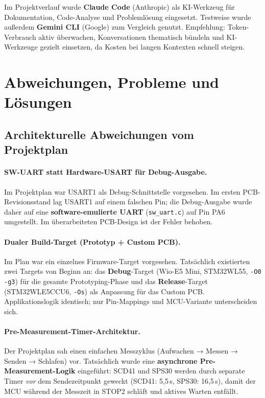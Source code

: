 \documentclass[11pt,a4paper]{scrartcl}
\begin{document}
Im Projektverlauf wurde \textbf{Claude Code} (Anthropic) als KI-Werkzeug für Dokumentation, Code-Analyse und Problemlösung eingesetzt. Testweise wurde außerdem \textbf{Gemini CLI} (Google) zum Vergleich genutzt. Empfehlung: Token-Verbrauch aktiv überwachen, Konversationen thematisch bündeln und KI-Werkzeuge gezielt einsetzen, da Kosten bei langen Kontexten schnell steigen.

\clearpage
\section{Abweichungen, Probleme und Lösungen}

\subsection*{Architekturelle Abweichungen vom Projektplan}

\paragraph{SW-UART statt Hardware-USART für Debug-Ausgabe.}
Im Projektplan war USART1 als Debug-Schnittstelle vorgesehen. Im ersten PCB-Revisionsstand lag USART1 auf einem falschen Pin; die Debug-Ausgabe wurde daher auf eine \textbf{software-emulierte UART} (\texttt{sw\_uart.c}) auf Pin PA6 umgestellt. Im überarbeiteten PCB-Design ist der Fehler behoben.

\paragraph{Dualer Build-Target (Prototyp + Custom PCB).}
Im Plan war ein einzelnes Firmware-Target vorgesehen. Tatsächlich existierten zwei Targets von Beginn an: das \textbf{Debug}-Target (Wio-E5 Mini, STM32WL55, \texttt{-O0 -g3}) für die gesamte Prototyping-Phase und das \textbf{Release}-Target (STM32WLE5CCU6, \texttt{-Os}) als Anpassung für das Custom PCB. Applikationslogik identisch; nur Pin-Mappings und MCU-Variante unterscheiden sich.

\paragraph{Pre-Measurement-Timer-Architektur.}
Der Projektplan sah einen einfachen Messzyklus (Aufwachen → Messen → Senden → Schlafen) vor. Tatsächlich wurde eine \textbf{asynchrone Pre-Measurement-Logik} eingeführt: SCD41 und SPS30 werden durch separate Timer \textit{vor} dem Sendezeitpunkt geweckt (SCD41: 5,5\,s, SPS30: 16,5\,s), damit der MCU während der Messzeit in STOP2 schläft und aktives Warten entfällt.
\end{document}
